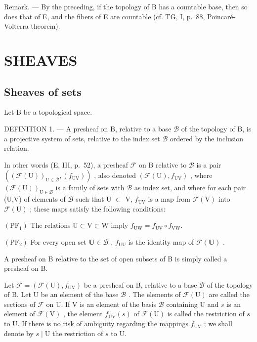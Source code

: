 Remark. --- By the preceding, if the topology of B has a countable base, then so does that of E, and the fibers of E are countable (cf. TG, I, p.~88, Poincaré-Volterra theorem).

\section{SHEAVES}

\subsection{Sheaves of sets}

Let B be a topological space.

DEFINITION 1. --- A presheaf on B, relative to a base \(\mathcal{B}\) of the topology of B, is a projective system of sets, relative to the index set \(\mathcal{B}\) ordered by the inclusion relation.

In other words (E, III, p.~52), a presheaf \(\mathcal{F}\) on B relative to \(\mathcal{B}\) is a pair \(((\mathcal{F}(\mathrm{U}))_{\mathrm{U}\in\mathcal{B}},(f_{\mathrm{UV}}))\) , also denoted \((\mathcal{F}(\mathrm{U}),f_{\mathrm{UV}})\) , where \((\mathcal{F}(\mathrm{U}))_{\mathrm{U}\in\mathcal{B}}\) is a family of sets with \(\mathcal{B}\) as index set, and where for each pair (U,V) of elements of \(\mathcal{B}\) such that U \(\subset\) V, \(f_{\mathrm{UV}}\) is a map from \(\mathcal{F}(\mathrm{V})\) into \(\mathcal{F}(\mathrm{U})\) ; these maps satisfy the following conditions:

\((\mathrm{PF}_{1})\) The relations \(\mathrm{U}\subset \mathrm{V}\subset \mathrm{W}\) imply \(f_{\mathrm{UW}} = f_{\mathrm{UV}}\circ f_{\mathrm{VW}}\).

\((\mathrm{PF}_2)\) For every open set \(\mathbf{U} \in \mathcal{B}\) , \(f_{\mathrm{UU}}\) is the identity map of \(\mathcal{F}(\mathbf{U})\) .

A presheaf on B relative to the set of open subsets of B is simply called a presheaf on B.

Let \(\mathcal{F} = (\mathcal{F}(\mathrm{U}), f_{\mathrm{UV}})\) be a presheaf on B, relative to a base \(\mathcal{B}\) of the topology of B. Let U be an element of the base \(\mathcal{B}\) . The elements of \(\mathcal{F}(\mathrm{U})\) are called the sections of \(\mathcal{F}\) on U. If V is an element of the basis \(\mathcal{B}\) containing U and \(s\) is an element of \(\mathcal{F}(\mathrm{V})\) , the element \(f_{\mathrm{UV}}(s)\) of \(\mathcal{F}(\mathrm{U})\) is called the restriction of \(s\) to U. If there is no risk of ambiguity regarding the mappings \(f_{\mathrm{UV}}\) ; we shall denote by \(s \mid \mathrm{U}\) the restriction of \(s\) to U.


